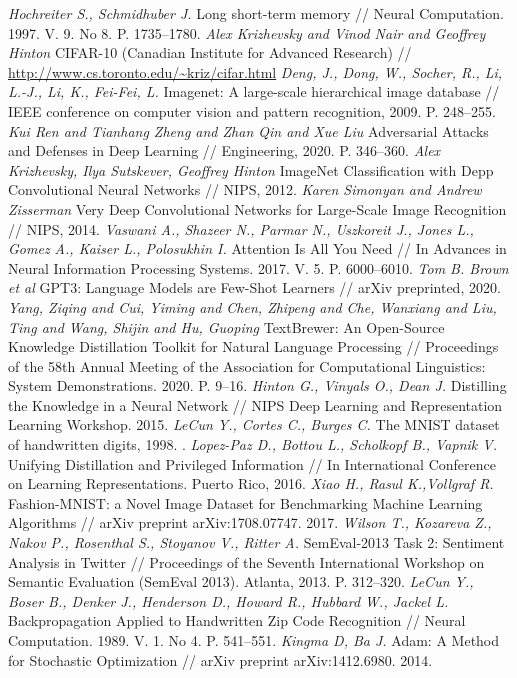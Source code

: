 \begin{thebibliography}{10}
	\textit{Hochreiter S., Schmidhuber J.} Long short-term memory // Neural Computation. 1997. V. 9. No 8.  P. 1735--1780.
	\textit{Alex Krizhevsky and Vinod Nair and Geoffrey Hinton} CIFAR-10 (Canadian Institute for Advanced Research) // \url{http://www.cs.toronto.edu/~kriz/cifar.html}
	\textit{Deng, J., Dong, W., Socher, R., Li, L.-J., Li, K., Fei-Fei, L. } Imagenet: A large-scale hierarchical image database //  IEEE conference on computer vision and pattern recognition, 2009. P. 248--255. 
	\textit{Kui Ren and Tianhang Zheng and Zhan Qin and Xue Liu} Adversarial Attacks and Defenses in Deep Learning // Engineering, 2020. P. 346--360.
	\textit{Alex Krizhevsky, Ilya Sutskever, Geoffrey Hinton} ImageNet Classification with Depp Convolutional Neural Networks // NIPS, 2012.
	\textit{Karen Simonyan and Andrew Zisserman} Very Deep Convolutional Networks for Large-Scale Image Recognition // NIPS, 2014.
	\textit{Vaswani A., Shazeer N., Parmar N., Uszkoreit J., Jones L., Gomez A., Kaiser L., Polosukhin I.} Attention Is All You Need // In Advances in Neural Information Processing Systems. 2017. V. 5. P. 6000--6010.
        \textit{Tom B. Brown et al} GPT3: Language Models are Few-Shot Learners // arXiv preprinted, 2020.
        \textit{Yang, Ziqing and Cui, Yiming and Chen, Zhipeng and Che, Wanxiang and Liu, Ting and Wang, Shijin and Hu, Guoping} {T}ext{B}rewer: {A}n {O}pen-{S}ource {K}nowledge {D}istillation {T}oolkit for {N}atural {L}anguage {P}rocessing // Proceedings of the 58th Annual Meeting of the Association for Computational Linguistics: System Demonstrations.  2020. P. 9--16.
        \textit{Hinton G., Vinyals O., Dean J.} Distilling the Knowledge in a Neural Network // NIPS Deep Learning and Representation Learning Workshop. 2015.
	\textit{LeCun Y.,  Cortes C., Burges C.} The MNIST dataset of handwritten digits, 1998. .
	\textit{Lopez-Paz D., Bottou L., Scholkopf B., Vapnik V.} Unifying Distillation and Privileged Information // In International Conference on Learning Representations. Puerto Rico, 2016.
	\textit{Xiao H., Rasul K.,Vollgraf R.} Fashion-MNIST: a Novel Image Dataset for Benchmarking Machine Learning Algorithms // arXiv preprint arXiv:1708.07747. 2017.
	\textit{Wilson T., Kozareva Z., Nakov P., Rosenthal S., Stoyanov V., Ritter A.} {S}em{E}val-2013 Task 2: Sentiment Analysis in Twitter // Proceedings of the Seventh International Workshop on Semantic Evaluation ({S}em{E}val 2013). Atlanta, 2013. P. 312--320.
	\textit{LeCun Y., Boser B., Denker J., Henderson D., Howard R., Hubbard W., Jackel L.} Backpropagation Applied to Handwritten Zip Code Recognition // Neural Computation. 1989. V. 1. No 4. P. 541--551.
	\textit{Kingma D, Ba J.} Adam: A Method for Stochastic Optimization // arXiv preprint arXiv:1412.6980. 2014.
\end{thebibliography}